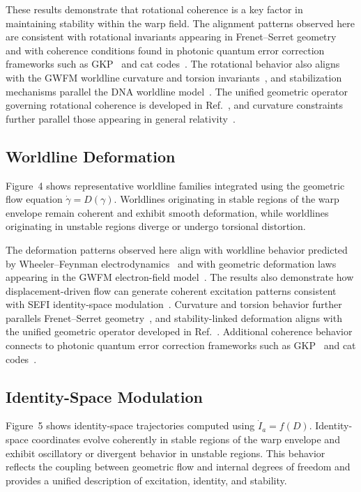 \documentclass[aip,adv,reprint]{revtex4-2}
\begin{document}
These results demonstrate that rotational coherence is a key factor in
maintaining stability within the warp field. The alignment patterns observed
here are consistent with rotational invariants appearing in Frenet--Serret
geometry~\cite{Frenet_1851,Serret_1851} and with coherence conditions found in
photonic quantum error correction frameworks such as GKP~\cite{GKP_2001} and
cat codes~\cite{Mirrahimi_2014}. The rotational behavior also aligns with the
GWFM worldline curvature and torsion invariants~\cite{Dutton_GWFM_JMP_2026},
and stabilization mechanisms parallel the DNA worldline model~\cite{Dutton_DNA_2026}.
The unified geometric operator governing rotational coherence is developed in
Ref.~\cite{Dutton_Unified_JMP_2026}, and curvature constraints further parallel
those appearing in general relativity~\cite{MTW_Gravitation_1973}.

\subsection{Worldline Deformation}

Figure~4 shows representative worldline families integrated using the geometric
flow equation $\dot{\gamma}=D(\gamma)$. Worldlines originating in stable
regions of the warp envelope remain coherent and exhibit smooth deformation,
while worldlines originating in unstable regions diverge or undergo torsional
distortion.

The deformation patterns observed here align with worldline behavior predicted
by Wheeler--Feynman electrodynamics~\cite{Wheeler_Feynman_1945,Wheeler_Feynman_1949}
and with geometric deformation laws appearing in the GWFM electron-field model~\cite{Dutton_GWFM_JMP_2026}.
The results also demonstrate how displacement-driven flow can generate coherent
excitation patterns consistent with SEFI identity-space modulation~\cite{Dutton_SEFI_JMP_2026}.
Curvature and torsion behavior further parallels Frenet--Serret geometry~\cite{Frenet_1851,Serret_1851},
and stability-linked deformation aligns with the unified geometric operator
developed in Ref.~\cite{Dutton_Unified_JMP_2026}. Additional coherence behavior
connects to photonic quantum error correction frameworks such as GKP~\cite{GKP_2001}
and cat codes~\cite{Mirrahimi_2014}.

\subsection{Identity-Space Modulation}

Figure~5 shows identity-space trajectories computed using $\dot{I}_a=f(D)$.
Identity-space coordinates evolve coherently in stable regions of the warp
envelope and exhibit oscillatory or divergent behavior in unstable regions.
This behavior reflects the coupling between geometric flow and internal degrees
of freedom and provides a unified description of excitation, identity, and
stability.
\end{document}
